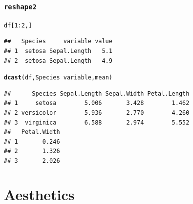 \documentclass{beamer}\usepackage[]{graphicx}\usepackage[]{color}
\makeatletter
\newcommand{\hlnum}[1]{\textcolor[rgb]{0.686,0.059,0.569}{#1}}%
\newcommand{\hlopt}[1]{\textcolor[rgb]{0,0,0}{#1}}%
\newcommand{\hlstd}[1]{\textcolor[rgb]{0.345,0.345,0.345}{#1}}%
\newcommand{\hlkwd}[1]{\textcolor[rgb]{0.737,0.353,0.396}{\textbf{#1}}}%
\newenvironment{kframe}{%
 \def\at@end@of@kframe{}%
 \ifinner\ifhmode%
  \def\at@end@of@kframe{\end{minipage}}%
  \begin{minipage}{\columnwidth}%
 \fi\fi%
 \def\FrameCommand##1{\hskip\@totalleftmargin \hskip-\fboxsep
 \colorbox{shadecolor}{##1}\hskip-\fboxsep
     \hskip-\linewidth \hskip-\@totalleftmargin \hskip\columnwidth}%
 \MakeFramed {\advance\hsize-\width
   \@totalleftmargin\z@ \linewidth\hsize
   \@setminipage}}%
 {\par\unskip\endMakeFramed%
 \at@end@of@kframe}
\newenvironment{knitrout}{}{} %
\makeatother
\begin{document}
\begin{frame}[fragile]
\frametitle{\texttt{reshape2}}
\begin{knitrout}\footnotesize
{}\color{fgcolor}\begin{kframe}
\begin{alltt}
\hlstd{df[}\hlnum{1}\hlopt{:}\hlnum{2}\hlstd{, ]}
\end{alltt}
\begin{verbatim}
##   Species     variable value
## 1  setosa Sepal.Length   5.1
## 2  setosa Sepal.Length   4.9
\end{verbatim}
\begin{alltt}
\hlkwd{dcast}\hlstd{(df, Species} \hlopt{~} \hlstd{variable, mean)}
\end{alltt}
\begin{verbatim}
##      Species Sepal.Length Sepal.Width Petal.Length
## 1     setosa        5.006       3.428        1.462
## 2 versicolor        5.936       2.770        4.260
## 3  virginica        6.588       2.974        5.552
##   Petal.Width
## 1       0.246
## 2       1.326
## 3       2.026
\end{verbatim}
\end{kframe}
\end{knitrout}
\end{frame}


\section*{Aesthetics}
\frame{\sectionpage}

\end{document}
